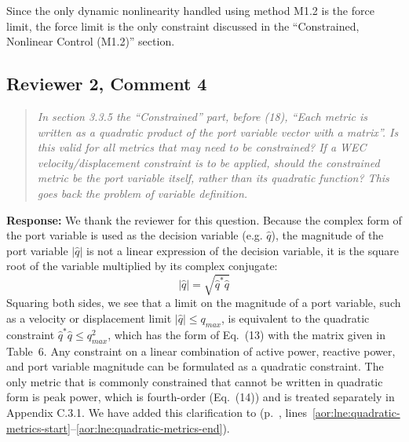 \documentclass[11pt]{article}
\newcommand{\rcomment}[2]{\subsection*{#1}\begin{quote}\itshape #2\end{quote}}
\newcommand{\response}{\noindent\textbf{Response:} }
\begin{document}
Since the only dynamic nonlinearity handled using method M1.2 is the force limit, the force limit is the only constraint discussed in the ``Constrained, Nonlinear Control (M1.2)'' section.

\rcomment{Reviewer 2, Comment 4}{In section 3.3.5 the ``Constrained'' part, before (18), ``Each metric is written as a quadratic product of the port variable vector with a matrix''. Is this valid for all metrics that may need to be constrained? If a WEC velocity/displacement constraint is to be applied, should the constrained metric be the port variable itself, rather than its quadratic function? This goes back the problem of variable definition.}
\response We thank the reviewer for this question.
Because the complex form of the port variable is used as the decision variable (e.g. $\hat{q}$), the magnitude of the port variable $|\hat{q}|$ is not a linear expression of the decision variable, it is the square root of the variable multiplied by its complex conjugate:
\begin{equation}
 |\hat{q}| = \sqrt{\hat{q}^* \hat{q}}
\end{equation}
Squaring both sides, we see that a limit on the magnitude of a port variable, such as a velocity or displacement limit $|\hat{q}| \le q_{max}$, is equivalent to the quadratic constraint $\hat{q}^* \hat{q} \le q_{max}^2$, which has the form of Eq.~(13) with the matrix given in Table~6.
Any constraint on a linear combination of active power, reactive power, and port variable magnitude can be formulated as a quadratic constraint.
The only metric that is commonly constrained that cannot be written in quadratic form is peak power, which is fourth-order (Eq.~(14)) and is treated separately in Appendix C.3.1.
We have added this clarification to 
(p.~\pageref{aor:lne:quadratic-metrics-start}, lines~\ref{aor:lne:quadratic-metrics-start}--\ref{aor:lne:quadratic-metrics-end}).
\end{document}
